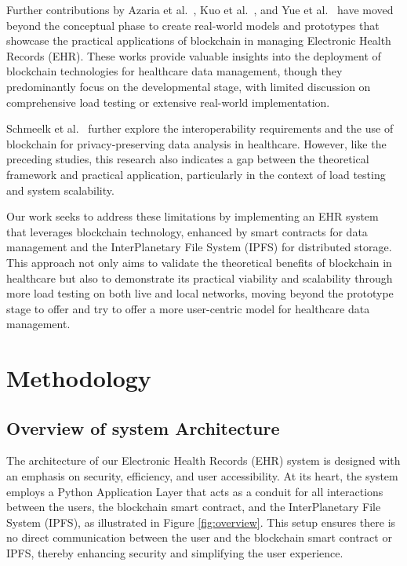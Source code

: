 \documentclass[12pt]{report}
\begin{document}
Further contributions by Azaria et al.~\cite{azaria2016medrec}, Kuo et al.~\cite{kuo2017distributedled}, and Yue et al.~\cite{yue2016healthcare} have moved beyond the conceptual phase to create real-world models and prototypes that showcase the practical applications of blockchain in managing Electronic Health Records (EHR). These works provide valuable insights into the deployment of blockchain technologies for healthcare data management, though they predominantly focus on the developmental stage, with limited discussion on comprehensive load testing or extensive real-world implementation.

Schmeelk et al.~\cite{schmeelk2022electronic} further explore the interoperability requirements and the use of blockchain for privacy-preserving data analysis in healthcare. However, like the preceding studies, this research also indicates a gap between the theoretical framework and practical application, particularly in the context of load testing and system scalability.

Our work seeks to address these limitations by implementing an EHR system that leverages blockchain technology, enhanced by smart contracts for data management and the InterPlanetary File System (IPFS) for distributed storage. This approach not only aims to validate the theoretical benefits of blockchain in healthcare but also to demonstrate its practical viability and scalability through more load testing on both live and local networks, moving beyond the prototype stage to offer and try to offer a more user-centric model for healthcare data management.

\section{Methodology}
\subsection{Overview of system Architecture}
The architecture of our Electronic Health Records (EHR) system is designed with an emphasis on security, efficiency, and user accessibility. At its heart, the system employs a Python Application Layer that acts as a conduit for all interactions between the users, the blockchain smart contract, and the InterPlanetary File System (IPFS), as illustrated in Figure \ref{fig:overview}. This setup ensures there is no direct communication between the user and the blockchain smart contract or IPFS, thereby enhancing security and simplifying the user experience.
\end{document}
